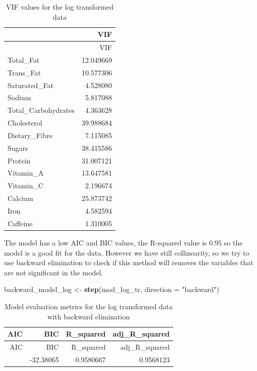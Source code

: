 \documentclass[
]{article}
\newenvironment{Shaded}{\begin{snugshade}}{\end{snugshade}}
\newcommand{\AttributeTok}[1]{\textcolor[rgb]{0.13,0.29,0.53}{#1}}
\newcommand{\FunctionTok}[1]{\textcolor[rgb]{0.13,0.29,0.53}{\textbf{#1}}}
\newcommand{\NormalTok}[1]{#1}
\newcommand{\OtherTok}[1]{\textcolor[rgb]{0.56,0.35,0.01}{#1}}
\newcommand{\StringTok}[1]{\textcolor[rgb]{0.31,0.60,0.02}{#1}}
\begin{document}
\begin{longtable}[]{@{}lr@{}}
\caption{VIF values for the log transformed data}\tabularnewline
\toprule\noalign{}
& VIF \\
\midrule\noalign{}
\endfirsthead
\toprule\noalign{}
& VIF \\
\midrule\noalign{}
\endhead
\bottomrule\noalign{}
\endlastfoot
Total\_Fat & 12.049669 \\
Trans\_Fat & 10.577306 \\
Saturated\_Fat & 4.528080 \\
Sodium & 5.817088 \\
Total\_Carbohydrates & 4.363628 \\
Cholesterol & 39.988684 \\
Dietary\_Fibre & 7.115085 \\
Sugars & 38.415586 \\
Protein & 31.007121 \\
Vitamin\_A & 13.647581 \\
Vitamin\_C & 2.196674 \\
Calcium & 25.873742 \\
Iron & 4.582594 \\
Caffeine & 1.310005 \\
\end{longtable}

The model has a low AIC and BIC values, the R-squared value is \(0.95\)
so the model is a good fit for the data. However we have still
collinearity, so we try to use backward elimination to check if this
method will removes the variables that are not significant in the model.

\begin{Shaded}
\begin{Highlighting}[]
\NormalTok{backward\_model\_log }\OtherTok{\textless{}{-}} \FunctionTok{step}\NormalTok{(mod\_log\_tr, }\AttributeTok{direction =} \StringTok{"backward"}\NormalTok{)}
\end{Highlighting}
\end{Shaded}

\begin{longtable}[]{@{}rrrr@{}}
\caption{Model evaluation metrics for the log transformed data with
backward elimination}\tabularnewline
\toprule\noalign{}
AIC & BIC & R\_squared & adj\_R\_squared \\
\midrule\noalign{}
\endfirsthead
\toprule\noalign{}
AIC & BIC & R\_squared & adj\_R\_squared \\
\midrule\noalign{}
\endhead
\bottomrule\noalign{}
\endlastfoot
-63.78109 & -32.38065 & 0.9580667 & 0.9568123 \\
\end{longtable}
\end{document}
